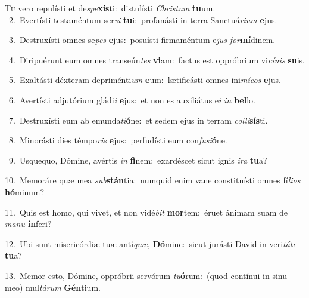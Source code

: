 \lettrine{\initial\textcolor{\initialcolor}{T}}{u} vero repulísti et de\-\textit{spe}\-\textbf{xís}ti:~\star distulísti \textit{Chris}\-\textit{tum} \textbf{tu}\-um.\\
{\numbfont\textcolor{\numbcolor}{~2.}}~Evertísti testaméntum ser\textit{vi} \textbf{tu}\-i:~\star profanásti in terra Sanctuá\-\textit{ri}\-\textit{um} \textbf{e}\-jus.\par
{\numbfont\textcolor{\numbcolor}{~3.}}~Destruxísti omnes se\textit{pes} \textbf{e}\-jus:~\star posuísti firmaméntum e\textit{jus} \textit{for}\-\textbf{mí}dinem.\par
{\numbfont\textcolor{\numbcolor}{~4.}}~Diripuérunt eum omnes transeún\textit{tes} \textbf{vi}\-am:~\star factus est oppróbrium vi\-\textit{cí}\-\textit{nis} \textbf{su}\-is.\par
{\numbfont\textcolor{\numbcolor}{~5.}}~Exaltásti déxteram depriménti\textit{um} \textbf{e}\-um:~\star lætificásti omnes ini\-\textit{mí}\-\textit{cos} \textbf{e}\-jus.\par
{\numbfont\textcolor{\numbcolor}{~6.}}~Avertísti adjutórium gládi\textit{i} \textbf{e}\-jus:~\star et non es auxiliátus e\textit{i} \textit{in} \textbf{bel}\-lo.\par
{\numbfont\textcolor{\numbcolor}{~7.}}~Destruxísti eum ab emunda\-\textit{ti}\-\textbf{ó}ne:~\star et sedem ejus in terram \textit{col}\-\textit{li}\textbf{sís}ti.\par
{\numbfont\textcolor{\numbcolor}{~8.}}~Minorásti dies témpo\textit{ris} \textbf{e}\-jus:~\star perfudísti eum con\-\textit{fu}\-\textit{si}\textbf{ó}ne.\par
{\numbfont\textcolor{\numbcolor}{~9.}}~Usquequo, Dómine, avértis \textit{in} \textbf{fi}\-nem:~\star exardéscet sicut ignis \textit{i}\-\textit{ra} \textbf{tu}\-a?\par
{\numbfont\textcolor{\numbcolor}{10.}}~Memoráre quæ mea \textit{sub}\-\textbf{stán}tia:~\star numquid enim vane constituísti omnes fí\-\textit{li}\-\textit{os} \textbf{hó}\-minum?\par
{\numbfont\textcolor{\numbcolor}{11.}}~Quis est homo, qui vivet, et non vidé\textit{bit} \textbf{mor}\-tem:~\star éruet ánimam suam de \textit{ma}\-\textit{nu} \textbf{ín}\-feri?\par
{\numbfont\textcolor{\numbcolor}{12.}}~Ubi sunt misericórdiæ tuæ antí\-\textit{quæ}\-, \textbf{Dó}\-mine:~\star sicut jurásti David in veri\-\textit{tá}\-\textit{te} \textbf{tu}\-a?\par
{\numbfont\textcolor{\numbcolor}{13.}}~Memor esto, Dómine, oppróbrii servórum \textit{tu}\-\textbf{ó}rum:~\star (quod contínui in sinu meo) mul\-\textit{tá}\-\textit{rum} \textbf{Gén}\-tium.\par
